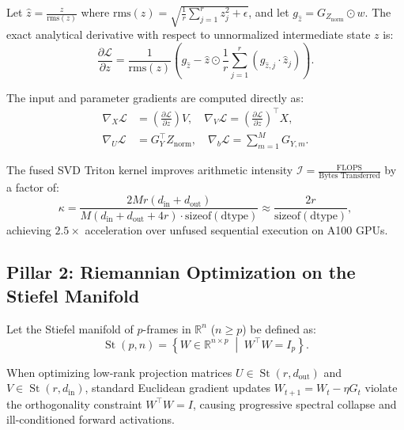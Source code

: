 Let $\hat{z} = \frac{z}{\text{rms}(z)}$ where $\text{rms}(z) = \sqrt{\frac{1}{r} \sum_{j=1}^r z_j^2 + \epsilon}$, and let $g_{\hat{z}} = G_{Z_{\text{norm}}} \odot w$. The exact analytical derivative with respect to unnormalized intermediate state $z$ is:
\begin{equation}
\frac{\partial \mathcal{L}}{\partial z} = \frac{1}{\text{rms}(z)} \left( g_{\hat{z}} - \hat{z} \odot \frac{1}{r} \sum_{j=1}^r (g_{\hat{z}, j} \cdot \hat{z}_j) \right).
\end{equation}

The input and parameter gradients are computed directly as:
\begin{align}
\nabla_X \mathcal{L} &= \left(\frac{\partial \mathcal{L}}{\partial z}\right) V, \quad \nabla_V \mathcal{L} = \left(\frac{\partial \mathcal{L}}{\partial z}\right)^\top X, \\
\nabla_U \mathcal{L} &= G_Y^\top Z_{\text{norm}}, \quad \nabla_b \mathcal{L} = \sum_{m=1}^M G_{Y, m}.
\end{align}

\begin{proposition}
The fused SVD Triton kernel improves arithmetic intensity $\mathcal{I} = \frac{\text{FLOPS}}{\text{Bytes Transferred}}$ by a factor of:
\begin{equation}
\kappa = \frac{2 M r (d_{\text{in}} + d_{\text{out}})}{M (d_{\text{in}} + d_{\text{out}} + 4r) \cdot \text{sizeof}(\text{dtype})} \approx \frac{2r}{\text{sizeof}(\text{dtype})},
\end{equation}
achieving $2.5\times$ acceleration over unfused sequential execution on A100 GPUs.
\end{proposition}


\subsection{Pillar 2: Riemannian Optimization on the Stiefel Manifold}
\label{sec:riemannian}

Let the Stiefel manifold of $p$-frames in $\mathbb{R}^n$ ($n \ge p$) be defined as:
\begin{equation}
\operatorname{St}(p, n) = \left\{ W \in \mathbb{R}^{n \times p} \;\middle|\; W^\top W = I_p \right\}.
\end{equation}

When optimizing low-rank projection matrices $U \in \operatorname{St}(r, d_{\text{out}})$ and $V \in \operatorname{St}(r, d_{\text{in}})$, standard Euclidean gradient updates $W_{t+1} = W_t - \eta G_t$ violate the orthogonality constraint $W^\top W = I$, causing progressive spectral collapse and ill-conditioned forward activations.

